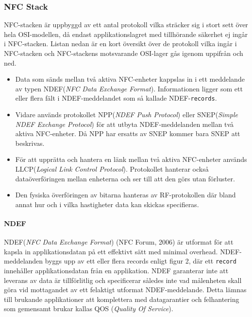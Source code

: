 \documentclass[11pt]{article}
\begin{document}
\subsubsection{NFC Stack}
NFC-stacken är uppbyggd av ett antal protokoll vilka sträcker sig i stort sett över hela OSI-modellen, då endast applikationslagret med tillhörande säkerhet ej ingår i NFC-stacken. Listan nedan är en kort översikt över de protokoll vilka ingår i NFC-stacken och NFC-stackens motsvarande OSI-lager gås igenom uppifrån och ned.

\begin{itemize}
\item Data som sänds mellan två aktiva NFC-enheter kappslas in i ett meddelande av typen NDEF(\textit{NFC Data Exchange Format}). Informationen ligger som ett eller flera fält i NDEF-meddelandet som så kallade NDEF-\texttt{records}. 

\item Vidare används protokollet NPP(\textit{NDEF Push Protocol}) eller SNEP(\textit{Simple NDEF Exchange Protocol}) för att utbyta NDEF-meddelanden mellan två aktiva NFC-enheter. Då NPP har ersatts av SNEP kommer bara SNEP att beskrivas.

\item För att upprätta och hantera en länk mellan två aktiva NFC-enheter används LLCP(\textit{Logical Link Control Protocol}). Protokollet hanterar också dataöverföringen mellan enheterna och ser till att den görs utan förluster.

\item Den fysiska överföringen av bitarna hanteras av RF-protokollen där bland annat hur och i vilka hastigheter data kan skickas specifieras.

\end{itemize}


\paragraph{NDEF}

NDEF(\textit{NFC Data Exchange Format}) (NFC Forum, 2006) är utformat för att kapsla in applikationsdatan på ett effektivt sätt med minimal overhead. NDEF-meddelanden byggs upp av ett eller flera records enligt figur 2, där ett \texttt{record} innehåller applikationsdatan från en applikation. NDEF garanterar inte att leverans av data är tillförlitlig och specificerar således inte vad målenheten skall göra vid mottagandet av ett felaktigt utformat NDEF-meddelande. Detta lämnas till brukande applikationer att komplettera med datagarantier och felhantering som gemensamt brukar kallas QOS (\textit{Quality Of Service}).
\end{document}
